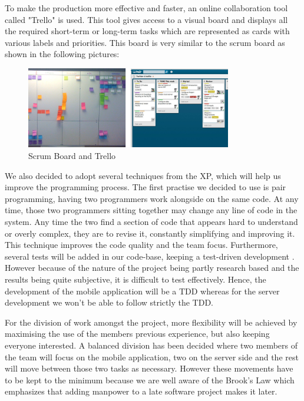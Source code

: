 To make the production more effective and faster, an online collaboration tool called "Trello" is used. This tool gives access to a visual board and displays all the required short-term or long-term tasks which are represented as cards with various labels and priorities. This board is very similar to the scrum board as shown in the following pictures:

\begin{figure}[here]
\begin{minipage}{\textwidth}
\begin{center}
\includegraphics[width=0.8\textwidth]{images/scrumboard.jpg}
\end{center}
\vspace{-20pt}
\caption[Caption for LOF]{Scrum Board and Trello\footnotemark}
\end{minipage} 
\end{figure}

We also decided to adopt several techniques from the XP, which will help us improve the programming process. The first practise we decided to use is pair programming, having two programmers work alongside on the same code. At any time, those two programmers sitting together may change any line of code in the system. Any time the two find a section of code that appears hard to understand or overly complex, they are to revise it, constantly simplifying and improving it. This technique improves the code quality and the team focus. Furthermore, several tests will be added in our code-base, keeping a test-driven development . However because of the nature of the project being partly research based and the results being quite subjective, it is difficult to test effectively. Hence, the development of the mobile application will be a TDD whereas for the server development we won't be able to follow strictly the TDD.\cite{Cockburn}

For the division of work amongst the project, more flexibility will be achieved by maximising the use of the members previous experience, but also keeping everyone interested. A balanced division has been decided where two members of the team will focus on the mobile application, two on the server side and the rest will move between those two tasks as necessary. However these movements have to be kept to the minimum because we are well aware of the Brook's Law which emphasizes that adding manpower to a late software project makes it later.\cite{Brooks}

